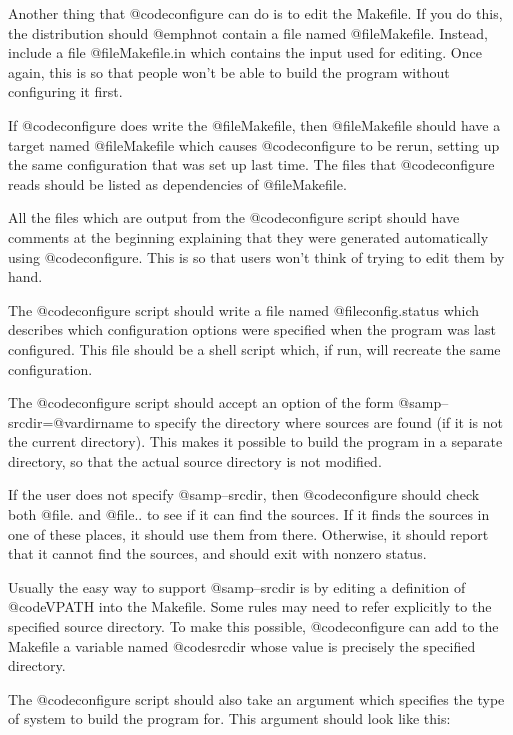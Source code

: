 Another thing that @code{configure} can do is to edit the Makefile.  If
you do this, the distribution should @emph{not} contain a file named
@file{Makefile}.  Instead, include a file @file{Makefile.in} which
contains the input used for editing.  Once again, this is so that people
won't be able to build the program without configuring it first.

If @code{configure} does write the @file{Makefile}, then @file{Makefile}
should have a target named @file{Makefile} which causes @code{configure}
to be rerun, setting up the same configuration that was set up last
time.  The files that @code{configure} reads should be listed as
dependencies of @file{Makefile}.

All the files which are output from the @code{configure} script should
have comments at the beginning explaining that they were generated
automatically using @code{configure}.  This is so that users won't think
of trying to edit them by hand.

The @code{configure} script should write a file named @file{config.status}
which describes which configuration options were specified when the
program was last configured.  This file should be a shell script which,
if run, will recreate the same configuration.

The @code{configure} script should accept an option of the form
@samp{--srcdir=@var{dirname}} to specify the directory where sources are found
(if it is not the current directory).  This makes it possible to build
the program in a separate directory, so that the actual source directory
is not modified.

If the user does not specify @samp{--srcdir}, then @code{configure} should
check both @file{.} and @file{..} to see if it can find the sources.  If
it finds the sources in one of these places, it should use them from
there.  Otherwise, it should report that it cannot find the sources, and
should exit with nonzero status.

Usually the easy way to support @samp{--srcdir} is by editing a
definition of @code{VPATH} into the Makefile.  Some rules may need to
refer explicitly to the specified source directory.  To make this
possible, @code{configure} can add to the Makefile a variable named
@code{srcdir} whose value is precisely the specified directory.

The @code{configure} script should also take an argument which specifies the
type of system to build the program for.  This argument should look like
this:

